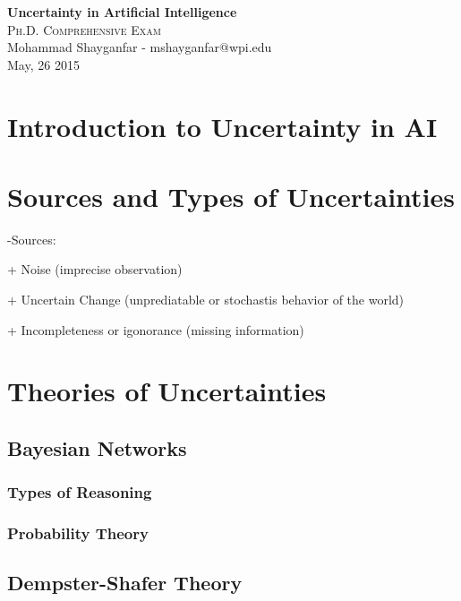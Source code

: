 \documentclass[11pt]{article}
\begin{document}

\begin{center}
{\LARGE{\textbf{Uncertainty in Artificial Intelligence}}} \\
\Large\textsc{Ph.D. Comprehensive Exam} \\[1em]
\large\textnormal{Mohammad Shayganfar - mshayganfar@wpi.edu} \\
\large\textnormal{May, 26 2015}
\end{center}

\section{Introduction to Uncertainty in AI}

\section{Sources and Types of Uncertainties}

-Sources:

+ Noise (imprecise observation)

+ Uncertain Change (unprediatable or stochastis behavior of the world)

+ Incompleteness or igonorance (missing information)

\section{Theories of Uncertainties}

\subsection{Bayesian Networks}

\subsubsection{Types of Reasoning}

\subsubsection{Probability Theory}

\subsection{Dempster-Shafer Theory}
\end{document}
